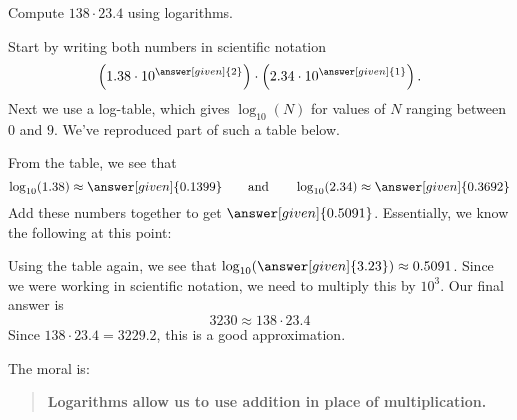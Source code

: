 \documentclass{ximera}
\begin{document}
\begin{example}
  Compute $138\cdot 23.4$ using logarithms.
  \begin{explanation}
    Start by writing both numbers in scientific notation
    \[
    \left(1.38\cdot 10^{\answer[given]{2}}\right)\cdot \left(2.34 \cdot 10^{\answer[given]{1}}\right).
    \]
    Next we use a log-table, which gives $\log_{10}(N)$ for values of
    $N$ ranging between $0$ and $9$. We've reproduced part of such a
    table below.
    \begin{image}
    \end{image}
    From the table, we see that 
    \[
    \log_{10}(1.38) \approx \answer[given]{0.1399}\qquad\text{and}\qquad \log_{10}(2.34)\approx \answer[given]{0.3692}
    \]
    Add these numbers together to get $\answer[given]{0.5091}$.
    Essentially, we know the following at this point:
    \begin{center}
    \end{center}
    Using the table again, we see that
    $\log_{10}(\answer[given]{3.23})\approx 0.5091$. Since we were
    working in scientific notation, we need to multiply this by
    $10^3$. Our final answer is
    \[
    3230 \approx 138\cdot 23.4
    \]
    Since $138\cdot 23.4 = 3229.2$, this is a good approximation.
  \end{explanation}
\end{example}
The moral is:
\begin{quote}
      \textbf{Logarithms allow us to use addition in place of multiplication.}
\end{quote}
\end{document}
